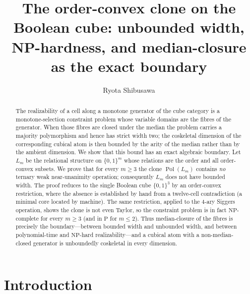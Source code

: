 \documentclass[11pt]{amsart}
\title[The order-convex clone on the cube: unbounded width and NP-hardness]
{The order-convex clone on the Boolean cube: unbounded width,
 NP-hardness, and median-closure as the exact boundary}
\author{Ryota Shibusawa}
\theoremstyle{plain}
\theoremstyle{definition}
\DeclareMathOperator{\Pol}{Pol}
\newcommand{\B}{\{0,1\}}
\begin{document}
\begin{abstract}
  The realizability of a cell along a monotone generator of the cube
  category is a monotone-selection constraint problem whose variable
  domains are the fibres of the generator.  When those fibres are
  closed under the median the problem carries a majority polymorphism
  and hence has strict width two; the coskeletal dimension of the
  corresponding cubical atom is then bounded by the arity of the
  median rather than by the ambient dimension.  We show that this
  bound has an exact algebraic boundary.  Let $L_m$ be the relational
  structure on $\B^m$ whose relations are the order and all
  order-convex subsets.  We prove that for every $m\ge 3$ the clone
  $\Pol(L_m)$ contains \emph{no} ternary weak near-unanimity
  operation; consequently $L_m$ does not have bounded width.  The
  proof reduces to the single Boolean cube $\B^3$ by an order-convex
  restriction, where the absence is established by hand from a
  twelve-cell contradiction (a minimal core located by machine).  The
  same restriction, applied to the $4$-ary Siggers operation, shows the
  clone is not even Taylor, so the constraint problem is in fact
  $\mathrm{NP}$-complete for every $m\ge 3$ (and in $\mathrm P$ for
  $m\le 2$).  Thus median-closure of the fibres is precisely the
  boundary---between bounded width and unbounded width, and between
  polynomial-time and $\mathrm{NP}$-hard realizability---and a cubical
  atom with a non-median-closed generator is unboundedly coskeletal in
  every dimension.
\end{abstract}

\maketitle

\section{Introduction}
\end{document}
